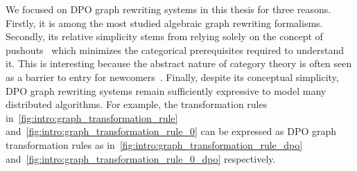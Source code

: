   We focused on DPO graph rewriting systems in this thesis for three reasons.
   Firstly, it is among the most studied algebraic graph rewriting formalisms.
   Secondly, its relative simplicity stems from relying solely on the concept of pushouts~\cite{pierce1991basic} which minimizes the categorical prerequisites required to understand it. This is interesting because the abstract nature of category theory is often seen as a barrier to entry for newcomers~\cite{overbeekthesis}.
    Finally, despite its conceptual simplicity, DPO graph rewriting systems remain sufficiently expressive to model many distributed algorithms. For example, the transformation rules in~\autoref{fig:intro:graph_transformation_rule} and~\autoref{fig:intro:graph_transformation_rule_0} can be expressed as DPO graph transformation rules as in~\autoref{fig:intro:graph_transformation_rule_dpo} and~\autoref{fig:intro:graph_transformation_rule_0_dpo} respectively.
    \begin{figure}[htbp]
    \centering
    \caption{}
    \label{fig:intro:graph_transformation_rule_dpo}
\end{figure}
